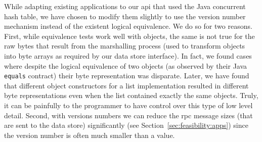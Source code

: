 While adapting existing applications to our \gls{api} that used the Java concurrent hash table, we have chosen to modify them slightly to use the version number mechanism instead of the existent logical equivalence. We do so for two reasons. First, while equivalence tests work well with objects, the same is not true for the raw bytes that result from the marshalling process (used to transform objects into byte arrays as required by our data store interface). In fact, we found cases where despite the  logical equivalence of two objects (as observed by their Java \texttt{equals} contract) their byte representation was disparate. Later, we have found that different object constructors for a list implementation resulted in different byte representations even when the list contained exactly the same objects. Truly, it can be painfully to the programmer to have control over this type of low level detail. Second, with versions numbers we can  reduce the \gls{rpc} message sizes (that are sent to the data store) significantly (see Section~\ref{sec:feasibility:apps}) since the version number is often much smaller than a value. 


